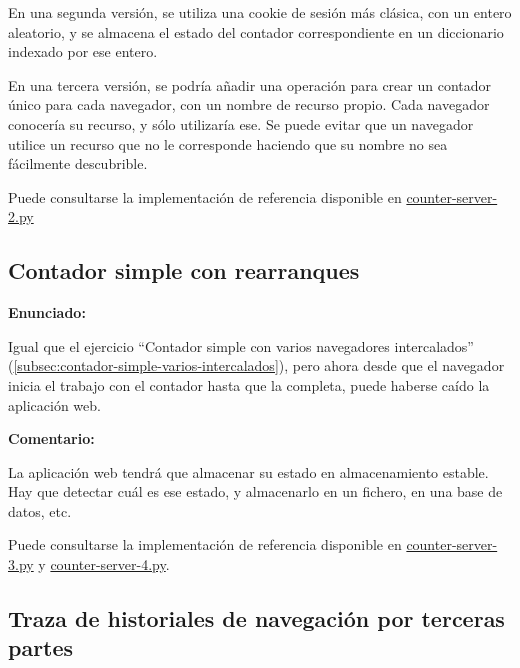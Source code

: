 En una segunda versión, se utiliza una cookie de sesión más clásica, con un entero aleatorio, y se almacena el estado del contador correspondiente en un diccionario indexado por ese entero.

En una tercera versión, se podría añadir una operación para crear un contador único para cada navegador, con un nombre de recurso propio. Cada navegador conocería su recurso, y sólo utilizaría ese. Se puede evitar que un navegador utilice un recurso que no le corresponde haciendo que su nombre no sea fácilmente descubrible.

Puede consultarse la implementación de referencia disponible en
\href{https://github.com/CursosWeb/Code/blob/master/Python-Web/counter/counter-server-2.py}{counter-server-2.py}

\subsection{Contador simple con rearranques}
\label{subsec:contador-simple-rearranques}

\textbf{Enunciado:}

Igual que el ejercicio ``Contador simple con varios navegadores intercalados'' (\ref{subsec:contador-simple-varios-intercalados}), pero ahora desde que el navegador inicia el trabajo con el contador hasta que la completa, puede haberse caído la aplicación web.

\textbf{Comentario:}

La aplicación web tendrá que  almacenar su estado en almacenamiento estable. Hay que detectar cuál es ese estado, y almacenarlo en  un fichero, en  una base de datos, etc.

Puede consultarse la implementación de referencia disponible en
\href{https://github.com/CursosWeb/Code/blob/master/Python-Web/counter/counter-server-3.py}{counter-server-3.py} y
\href{https://github.com/CursosWeb/Code/blob/master/Python-Web/counter/counter-server-4.py}{counter-server-4.py}.


\subsection{Traza de historiales de navegación por terceras partes}
\label{subsec:navegacion-terceras-partes}

